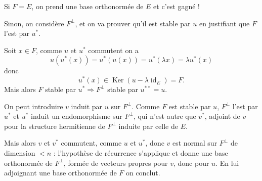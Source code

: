 Si $F=E$, on prend une base orthonormée de $E$ et c'est gagné !

Sinon, on considère $F^\perp$, et on va prouver qu'il est stable par $u$ en justifiant que $F$ l'est par $u^*$.

Soit $x\in F$, comme $u$ et $u^*$ commutent on a
\[
u(u^*(x))=u^*(u(x))=u^*(\lambda x)=\lambda u^*(x)
\]
donc
\[
u^*(x)\in\operatorname{Ker}(u-\lambda\operatorname{id}_E)=F.
\]
Mais alors $F$ stable par $u^*\Rightarrow F^\perp$ stable par $u^{**}=u$.

On peut introduire $v$ induit par $u$ sur $F^\perp$. Comme $F$ est stable par $u$, $F^\perp$ l'est par $u^*$ et $u^*$ induit un endomorphisme sur $F^\perp$, qui n'est autre que $v^*$, adjoint de $v$ pour la structure hermitienne de $F^\perp$ induite par celle de $E$.

Mais alors $v$ et $v^*$ commutent, comme $u$ et $u^*$, donc $v$ est normal sur $F^\perp$ de dimension $<n$ : l'hypothèse de récurrence s'applique et donne une base orthonormée de $F^\perp$, formée de vecteurs propres pour $v$, donc pour $u$. En lui adjoignant une base orthonormée de $F$ on conclut. \bookend
